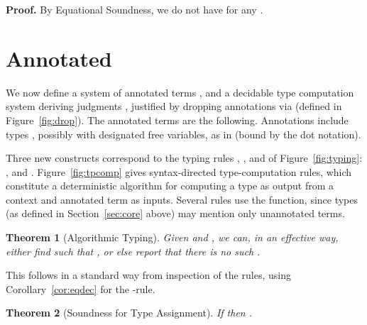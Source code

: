 \documentclass[copyright]{eptcs}
\newtheorem{theorem}{Theorem}
\begin{document}
\noindent \textbf{Proof.} By Equational Soundness, we do not have  for any .

\section{Annotated }
\label{sec:tvec}

We now define a system of annotated terms , and a decidable type
computation system deriving judgments ,
justified by dropping annotations via  (defined in
Figure~\ref{fig:drop}).  The annotated terms  are the following.
Annotations include types , possibly with designated free
variables, as in  (bound by the dot notation).

\noindent Three new constructs correspond to the typing rules
, , and  of
Figure~\ref{fig:typing}: ,  and
.  Figure~\ref{fig:tpcomp} gives
syntax-directed type-computation rules, which constitute a
deterministic algorithm for computing a type  as output from a
context  and annotated term  as inputs.  Several rules use
the  function, since types  (as defined in
Section~\ref{sec:core} above) may mention only unannotated terms.

\begin{comment}
We define 
independently of typing.  This simplifies the presentation, and means
that we need not worry whether a term is typable or not before we drop
its annotations.  We record the fact that the type-computation rules
constitute an algorithm as a theorem:
\end{comment}

\begin{theorem}[Algorithmic Typing]
Given  and , we can, in an effective way, either find
 such that , or else report that there
is no such .
\end{theorem}

\noindent This follows in a standard way from inspection of the rules,
using Corollary~\ref{cor:eqdec} for the -rule.

\begin{theorem}[Soundness for Type Assignment]
If  then .
\end{theorem}

\begin{comment}
We omit the corresponding notion of completeness,
since the unrestricted nature of the type assignment rule for
\texttt{(join)} (of Figure~\ref{fig:typing}) makes it impossible to
have a complete corresponding rule in the annotated system.
\end{comment}
\end{document}
